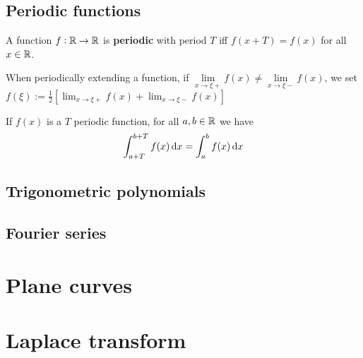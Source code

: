 \documentclass[../Year1/Year1.tex]{subfiles}
\begin{document}
\subsection{Periodic functions}

\begin{definition}
    A function $f:\mathbb{R}\rightarrow\mathbb{R}$ is \textbf{periodic} with period $T$ iff $f(x+T)=f(x)$ for all $x\in\mathbb{R}$.
\end{definition}

\begin{definition}[Discontinuity]
    When periodically extending a function, if $\lim\limits_{x\rightarrow\xi+}f(x) \neq \lim\limits_{x\rightarrow\xi-}f(x)$, we set $\displaystyle f(\xi):=\frac{1}{2}\left[\lim_{x\rightarrow\xi+}f(x) + \lim_{x\rightarrow\xi-}f(x)\right]$
\end{definition}

\begin{theorem}
    If $f(x)$ is a $T$ periodic function, for all $a,b\in\mathbb{R}$ we have \[
        \intd{a+T}{b+T}{f(x)}{x} = \intd{a}{b}{f(x)}{x}
    \]
\end{theorem}

\subsection{Trigonometric polynomials}



\subsection{Fourier series}

\section{Plane curves}

\section{Laplace transform}
\end{document}
